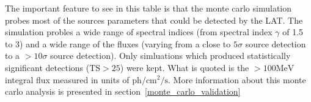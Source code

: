 \documentclass[preprint]{aastex}
\newcommand{\mev}{\text{MeV}\xspace}
\newcommand{\s}{\text{s}\xspace}
\newcommand{\ph}{\text{ph}\xspace}
\newcommand{\cm}{\text{cm}\xspace}
\newcommand{\ts}{\text{TS}\xspace}
\begin{document}
\begin{table}
\begin{centering}
{    The important feature to see in this table is that the monte carlo
    simulation probes most of the sources parameters that could be detected
    by the LAT.  The simulation probles a wide range of spectral indices
    (from spectral index $\gamma$ of 1.5 to 3) and a wide range of the fluxes
    (varying from a close to $5\sigma$ source detection to a $>10\sigma$
    source detection).  Only simluations which produced statistically
    significant detections ($\ts>25$) were kept.  What is quoted is the
    $>100\mev$ integral flux measured in units of $\ph/\cm^2/\s$.
    More information about this monte carlo analysis is presented in
    section~\ref{monte_carlo_validation}
    }
    \label{ts_ext_num_sims}
  \end{centering}
\end{table}

\clearpage
\end{document}
